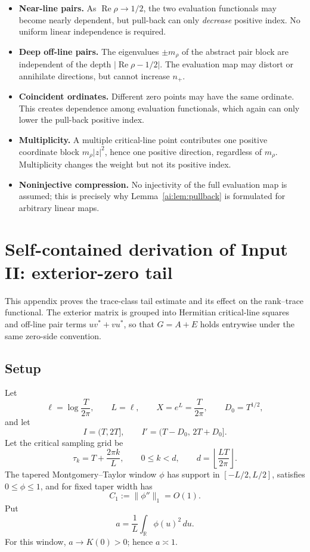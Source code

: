 \documentclass[11pt]{article}
\begin{document}
\begin{itemize}
\item \textbf{Near-line pairs.}
As $\operatorname{Re}\rho\to1/2$, the two evaluation functionals may become
nearly dependent, but pull-back can only \emph{decrease} positive index.
No uniform linear independence is required.

\item \textbf{Deep off-line pairs.}
The eigenvalues $\pm m_\rho$ of the abstract pair block are independent of
the depth $|\operatorname{Re}\rho-1/2|$.  The evaluation map may distort or
annihilate directions, but cannot increase $n_+$.

\item \textbf{Coincident ordinates.}
Different zero points may have the same ordinate.  This creates dependence
among evaluation functionals, which again can only lower the pull-back
positive index.

\item \textbf{Multiplicity.}
A multiple critical-line point contributes one positive coordinate block
$m_\rho|z|^2$, hence one positive direction, regardless of $m_\rho$.
Multiplicity changes the weight but not its positive index.

\item \textbf{Noninjective compression.}
No injectivity of the full evaluation map is assumed; this is precisely why
Lemma~\ref{ai:lem:pullback} is formulated for arbitrary linear maps.
\end{itemize}



\section{Self-contained derivation of Input II: exterior-zero tail}\label{app:inputII}
This appendix proves the trace-class tail estimate and its effect on the
rank--trace functional.  The exterior matrix is grouped into Hermitian
critical-line squares and off-line pair terms $uv^*+vu^*$, so that
$G=A+E$ holds entrywise under the same zero-side convention.
\subsection{Setup}

Let
\[
 \ell=\log\frac{T}{2\pi},\qquad L=\ell,\qquad
 X=e^L=\frac{T}{2\pi},\qquad D_0=T^{1/2},
\]
and let
\[
 I=(T,2T],\qquad I'=(T-D_0,\,2T+D_0].
\]
Let the critical sampling grid be
\[
 \tau_k=T+\frac{2\pi k}{L},\qquad 0\le k<d,
 \qquad d=\left\lfloor\frac{LT}{2\pi}\right\rfloor.
\]
The tapered Montgomery--Taylor window $\phi$ has support in
$[-L/2,L/2]$, satisfies $0\le\phi\le1$, and for fixed taper width has
\[
 C_1:=\|\phi''\|_1=O(1).
\]
Put
\[
 a=\frac1L\int_{\mathbb R}\phi(u)^2\,du.
\]
For this window, $a\to K(0)>0$; hence $a\asymp1$.
\end{document}
